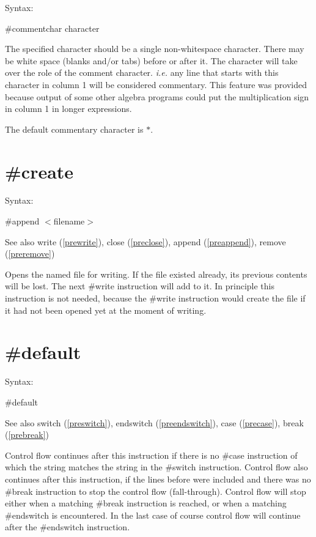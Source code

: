 \noindent Syntax:

\#commentchar character

\noindent The specified character should be a single 
non-whitespace character. There may be white space (blanks and/or tabs) 
before or after it. The character will take over the role of the comment 
character. {\it i.e.} any line that starts with this character in column 1 
will be considered commentary. This feature was provided 
because output of some other algebra programs could put the multiplication 
sign in column 1 in longer expressions.

The default commentary character is $\ast$.

 
\section{\#create}
\label{precreate}

\noindent Syntax:

\#append $<$filename$>$
 
\noindent See also write (\ref{prewrite}),
            close (\ref{preclose}), append (\ref{preappend}),
            remove (\ref{preremove})

\noindent Opens the named file for writing. If the file 
existed already, its previous contents will be lost. The next 
\#write instruction will add to it. In principle this 
instruction is not needed, because the \#write instruction would create the 
file if it had not been opened yet at the moment of writing.


\section{\#default}
\label{predefault}

\noindent Syntax:

\#default
 
\noindent See also switch (\ref{preswitch}),
        endswitch (\ref{preendswitch}),
        case (\ref{precase}),
        break (\ref{prebreak})

\noindent Control flow continues after this instruction if 
there is no \#case instruction of which the string matches 
the string in the \#switch instruction. Control flow also 
continues after this instruction, if the lines before were included and 
there was no \#break instruction to stop the control flow 
(fall-through). Control flow will stop either when a matching \#break 
instruction is reached, or when a matching \#endswitch 
is encountered. In the last case of course control flow will continue after 
the \#endswitch instruction.

